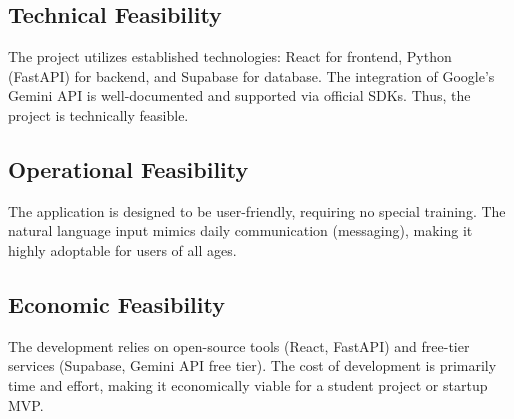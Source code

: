 \subsection{Technical Feasibility}
The project utilizes established technologies: React for frontend, Python (FastAPI) for backend, and Supabase for database. The integration of Google's Gemini API is well-documented and supported via official SDKs. Thus, the project is technically feasible.

\subsection{Operational Feasibility}
The application is designed to be user-friendly, requiring no special training. The natural language input mimics daily communication (messaging), making it highly adoptable for users of all ages.

\subsection{Economic Feasibility}
The development relies on open-source tools (React, FastAPI) and free-tier services (Supabase, Gemini API free tier). The cost of development is primarily time and effort, making it economically viable for a student project or startup MVP.
